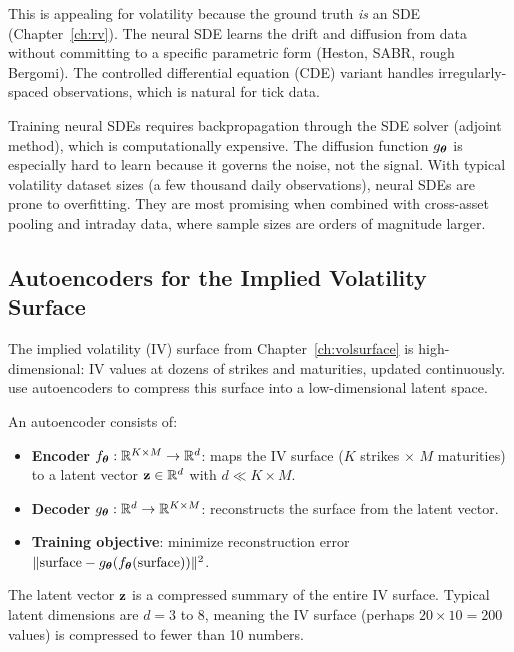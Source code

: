 This is appealing for volatility because the ground truth \emph{is} an SDE (Chapter~\ref{ch:rv}).
The neural SDE learns the drift and diffusion from data without committing to a specific parametric form (Heston, SABR, rough Bergomi).
The controlled differential equation (CDE) variant handles irregularly-spaced observations, which is natural for tick data.

\begin{warning}
Training neural SDEs requires backpropagation through the SDE solver (adjoint method), which is computationally expensive.
The diffusion function $g_{\bm{\theta}}$ is especially hard to learn because it governs the noise, not the signal.
With typical volatility dataset sizes (a few thousand daily observations), neural SDEs are prone to overfitting.
They are most promising when combined with cross-asset pooling and intraday data, where sample sizes are orders of magnitude larger.
\end{warning}

\subsection{Autoencoders for the Implied Volatility Surface}

The implied volatility (IV) surface from Chapter~\ref{ch:volsurface} is high-dimensional: IV values at dozens of strikes and maturities, updated continuously.
\citet{DingLuCheung2025} use autoencoders to compress this surface into a low-dimensional latent space.

\begin{definition}
An autoencoder consists of:
\begin{itemize}[nosep]
  \item \textbf{Encoder} $f_{\bm{\theta}}: \mathbb{R}^{K \times M} \to \mathbb{R}^d$: maps the IV surface ($K$ strikes $\times$ $M$ maturities) to a latent vector $\mathbf{z} \in \mathbb{R}^d$ with $d \ll K \times M$.
  \item \textbf{Decoder} $g_{\bm{\theta}}: \mathbb{R}^d \to \mathbb{R}^{K \times M}$: reconstructs the surface from the latent vector.
  \item \textbf{Training objective}: minimize reconstruction error $\|\text{surface} - g_{\bm{\theta}}(f_{\bm{\theta}}(\text{surface}))\|^2$.
\end{itemize}
The latent vector $\mathbf{z}$ is a compressed summary of the entire IV surface.
Typical latent dimensions are $d = 3$ to $8$, meaning the IV surface (perhaps $20 \times 10 = 200$ values) is compressed to fewer than 10 numbers.
\end{definition}

